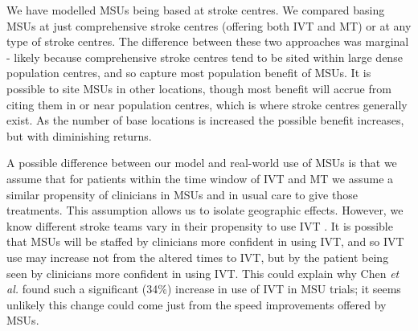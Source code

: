 We have modelled MSUs  being based at stroke centres. We compared basing MSUs at just comprehensive stroke centres (offering both IVT and MT) or at any type of stroke centres. The difference between these two approaches was marginal - likely because comprehensive stroke centres tend to be sited within large dense population centres, and so capture most population benefit of MSUs. It is possible to site MSUs in other locations, though most benefit will accrue from citing them in or near population centres, which is where stroke centres generally exist. As the number of base locations is increased the possible benefit increases, but with diminishing returns.

A possible difference between our model and real-world use of MSUs is that we assume that for patients within the time window of IVT and MT we assume a similar propensity of clinicians in MSUs and in usual care to give those treatments. This assumption allows us to isolate geographic effects. However, we know different stroke teams vary in their propensity to use IVT \cite{pearn_what_2023}. It is possible that MSUs will be staffed by clinicians more confident in using IVT, and so IVT use may increase not from the altered times to IVT, but by the patient being seen by clinicians more confident in using IVT. This could explain why Chen \textit{et al.} \cite{chen_systematic_2022} found such a significant (34\%) increase in use of IVT in MSU trials; it seems unlikely this change could come just from the speed improvements offered by MSUs.

